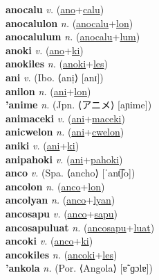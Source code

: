 \textbf{anocalu} \textit{v.} (\hyperref[ano]{ano}+\hyperref[calu]{calu})
 \label{anocalu} \\
\textbf{anocalulon} \textit{n.} (\hyperref[anocalu]{anocalu}+\hyperref[lon]{lon})
 \label{anocalulon} \\
\textbf{anocalulum} \textit{n.} (\hyperref[anocalu]{anocalu}+\hyperref[lum]{lum})
 \label{anocalulum} \\
\textbf{anoki} \textit{v.} (\hyperref[ano]{ano}+\hyperref[ki]{ki})
 \label{anoki} \\
\textbf{anokiles} \textit{n.} (\hyperref[anoki]{anoki}+\hyperref[les]{les})
 \label{anokiles} \\
\textbf{ani} \textit{v.} (Ibo. ⟨anị⟩ [anɪ])
 \label{ani} \\
\textbf{anilon} \textit{n.} (\hyperref[ani]{ani}+\hyperref[lon]{lon})
 \label{anilon} \\
\textbf{'anime} \textit{n.} (Jpn. ⟨アニメ⟩ [aɲime])
 \label{'anime} \\
\textbf{animaceki} \textit{v.} (\hyperref[ani]{ani}+\hyperref[maceki]{maceki})
 \label{animaceki} \\
\textbf{anicwelon} \textit{n.} (\hyperref[ani]{ani}+\hyperref[cwelon]{cwelon})
 \label{anicwelon} \\
\textbf{aniki} \textit{v.} (\hyperref[ani]{ani}+\hyperref[ki]{ki})
 \label{aniki} \\
\textbf{anipahoki} \textit{v.} (\hyperref[ani]{ani}+\hyperref[pahoki]{pahoki})
 \label{anipahoki} \\
\textbf{anco} \textit{v.} (Spa. ⟨ancho⟩ [ˈant͡ʃo])
 \label{anco} \\
\textbf{ancolon} \textit{n.} (\hyperref[anco]{anco}+\hyperref[lon]{lon})
 \label{ancolon} \\
\textbf{ancolyan} \textit{n.} (\hyperref[anco]{anco}+\hyperref[lyan]{lyan})
 \label{ancolyan} \\
\textbf{ancosapu} \textit{v.} (\hyperref[anco]{anco}+\hyperref[sapu]{sapu})
 \label{ancosapu} \\
\textbf{ancosapuluat} \textit{n.} (\hyperref[ancosapu]{ancosapu}+\hyperref[luat]{luat})
 \label{ancosapuluat} \\
\textbf{ancoki} \textit{v.} (\hyperref[anco]{anco}+\hyperref[ki]{ki})
 \label{ancoki} \\
\textbf{ancokiles} \textit{n.} (\hyperref[ancoki]{ancoki}+\hyperref[les]{les})
 \label{ancokiles} \\
\textbf{'ankola} \textit{n.} (Por. ⟨Angola⟩ [ɐ̃ˈɡɔlɐ])
 \label{'ankola} \\
